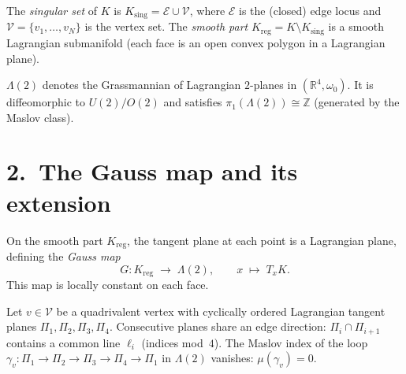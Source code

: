 \begin{definition}
The \emph{singular set} of $K$ is $K_{\mathrm{sing}} = \mathcal{E}\cup\mathcal{V}$,
where $\mathcal{E}$ is the (closed) edge locus and
$\mathcal{V}=\{v_1,\ldots,v_N\}$ is the vertex set. The \emph{smooth part}
$K_{\mathrm{reg}} = K\setminus K_{\mathrm{sing}}$ is a smooth Lagrangian
submanifold (each face is an open convex polygon in a Lagrangian plane).
\end{definition}

\begin{definition}
$\Lambda(2)$ denotes the Grassmannian of Lagrangian $2$-planes in
$(\mathbb{R}^4,\omega_0)$. It is diffeomorphic to $U(2)/O(2)$ and satisfies
$\pi_1(\Lambda(2))\cong\mathbb{Z}$ (generated by the Maslov class).
\end{definition}

\section*{2.\ The Gauss map and its extension}
\label{sec:p8-gauss}

On the smooth part $K_{\mathrm{reg}}$, the tangent plane at each point is
a Lagrangian plane, defining the \emph{Gauss map}
\[
  G: K_{\mathrm{reg}} \;\to\; \Lambda(2), \qquad x\;\mapsto\; T_xK.
\]
This map is locally constant on each face.

\begin{proposition}
\label{prop:p8-maslov}
Let $v\in\mathcal{V}$ be a quadrivalent vertex with cyclically ordered
Lagrangian tangent planes $\Pi_1,\Pi_2,\Pi_3,\Pi_4$. Consecutive planes
share an edge direction: $\Pi_i\cap\Pi_{i+1}$ contains a common line
$\ell_i$ (indices mod~$4$). The Maslov index of the loop
$\gamma_v: \Pi_1\to\Pi_2\to\Pi_3\to\Pi_4\to\Pi_1$ in $\Lambda(2)$
vanishes: $\mu(\gamma_v)=0$.
\end{proposition}

